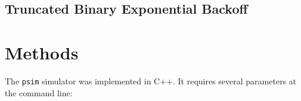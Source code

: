 \documentclass[twocolumn]{article}
\begin{document}
\subsection*{Truncated Binary Exponential Backoff}





\section*{Methods}

The \verb|psim| simulator was implemented in C++. It requires several parameters
at the command line:
\end{document}
